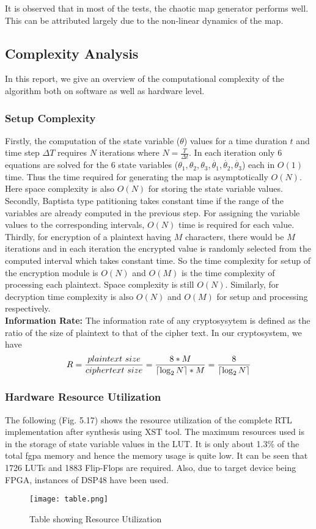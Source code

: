 It is observed that in most of the tests, the chaotic map generator performs well. This can be attributed largely due to the non-linear dynamics of the map.

\subsection{Complexity Analysis}

In this report, we give an overview of the computational complexity of the algorithm both on software as well as hardware level.

\subsubsection{Setup Complexity}
Firstly, the computation of the state variable (${\theta}$) values for a time duration $t$ and time step $\Delta T$ requires $N$ iterations where $N= \frac{T}{\Delta t}$. In each iteration only 6 equations are solved for the 6 state variables ($\theta_{1}, \theta_{2}, \theta_{3}, \dot{\theta_{1}}, \dot{\theta_{2}}, \dot{\theta_{3}}$) each in $O(1)$ time. Thus the time required for generating the map is asymptotically $O(N)$. Here space complexity is also $O(N)$ for storing the state variable values. Secondly, Baptista type patitioning takes constant time if the range of the variables are already computed in the previous step. For assigning the variable values to the corresponding intervals, $O(N)$ time is required for each value. Thirdly, for encryption of a plaintext having $M$ characters, there would be $M$ iterations and in each iteration the encrypted value is randomly selected from the computed interval which takes constant time. So the time complexity for setup of the encryption module is $O(N)$ and $O(M)$ is the time complexity of processing each plaintext. Space complexity is still $O(N)$. Similarly, for decryption time complexity is also $O(N)$ and $O(M)$ for setup and processing respectively.\\
\textbf{Information Rate:} The information rate of any cryptosysytem is defined as the ratio of the size of plaintext to that of the cipher text. In our cryptosystem, we have
\begin{equation}
R = \frac{plaintext\ size}{ciphertext\ size} = \frac{8*M}{\lceil\log_2N\rceil*M} = \frac{8}{\lceil\log_2N\rceil}
\end{equation}
\subsubsection{Hardware Resource Utilization}
The following (Fig. 5.17) shows the resource utilization of the complete RTL implementation after synthesis using XST tool. The maximum resources used is in the storage of state variable values in the LUT. It is only about 1.3\% of the total fgpa memory and hence the memory usage is quite low. It can be seen that 1726 LUTs and 1883 Flip-Flops are required. Also, due to target device being FPGA, instances of DSP48 have been used.
\begin{figure}[H]
\centering
\texttt{[image: table.png]}
\caption{Table showing Resource Utilization}\label{fig:table}
\end{figure}

